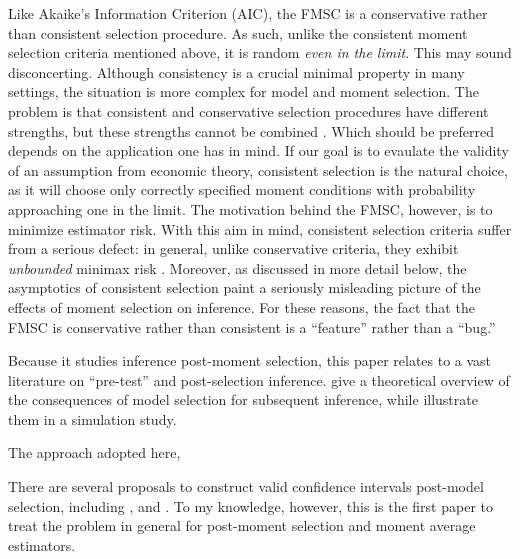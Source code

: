 Like Akaike's Information Criterion (AIC), the FMSC is a conservative rather than consistent selection procedure.
As such, unlike the consistent moment selection criteria mentioned above, it is random \emph{even in the limit}.
This may sound disconcerting.
Although consistency is a crucial minimal property in many settings, the situation is more complex for model and moment selection.
The problem is that consistent and conservative selection procedures have different strengths, but these strengths cannot be combined \cite{Yang2005}.
Which should be preferred depends on the application one has in mind.
If our goal is to evaulate the validity of an assumption from economic theory, consistent selection is the natural choice, as it will choose only correctly specified moment conditions with probability approaching one in the limit.
The motivation behind the FMSC, however, is to minimize estimator risk.
With this aim in mind, consistent selection criteria suffer from a serious defect: in general, unlike conservative criteria, they exhibit \emph{unbounded} minimax risk \cite{LeebPoetscher2008}.
Moreover, as discussed in more detail below, the asymptotics of consistent selection paint a seriously misleading picture of the effects of moment selection on inference.
For these reasons, the fact that the FMSC is conservative rather than consistent is a ``feature'' rather than a ``bug.''

Because it studies inference post-moment selection, this paper relates to a vast literature on ``pre-test'' and post-selection inference.
\citet{LeebPoetscher2005, LeebPoetscher2009} give a theoretical overview of the consequences of model selection for subsequent inference, while \cite{Demetrescu} illustrate them in a simulation study. 

The approach adopted here, 

There are several proposals to construct valid confidence intervals post-model selection, including \cite{Kabaila1998}, \cite{HjortClaeskens} and \cite{KabailaLeeb2006}. 
To my knowledge, however, this is the first paper to treat the problem in general for post-moment selection and moment average estimators.

